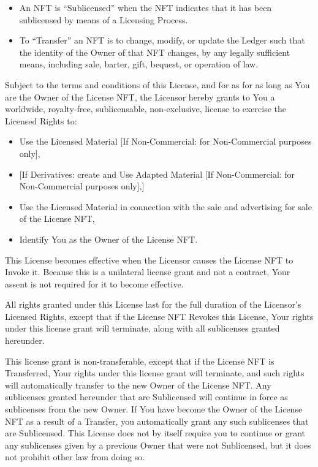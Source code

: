 \documentclass{article}
\newcommand{\sect}[1]{\vspace{12pt}\noindent{\strong{#1}}}
\begin{document}
\begin{sffamily}
\begin{itemize}
	\item	An NFT is ``Sublicensed'' when the NFT indicates that it has been sublicensed by means of a Licensing Process.

	\item	To ``Transfer'' an NFT is to change, modify, or update the Ledger such that the identity of the Owner of that NFT changes, by any legally sufficient means, including sale, barter, gift, bequest, or operation of law. 
	
	\end{itemize}



\sect{License Grant}

Subject to the terms and conditions of this License, and for as for as long as You are the Owner of the License NFT, the Licensor hereby grants to You a worldwide, royalty-free, sublicensable, non-exclusive, license to exercise the Licensed Rights to:
\begin{itemize}
\item Use the Licensed Material [If Non-Commercial: for Non-Commercial purposes only],
\item {[}If Derivatives: create and Use Adapted Material [If Non-Commercial: for Non-Commercial purposes only],]
\item Use the Licensed Material in connection with the sale and advertising for sale of the License NFT,
\item Identify You as the Owner of the License NFT.
\end{itemize}
This License becomes effective when the Licensor causes the License NFT to Invoke it. Because this is a unilateral license grant and not a contract, Your assent is not required for it to become effective.

All rights granted under this License last for the full duration of the Licensor's Licensed Rights, except that if the License NFT Revokes this License, Your rights under this license grant will terminate, along with all sublicenses granted hereunder. 

This license grant is non-transferable, except that if the License NFT is Transferred, Your rights under this license grant will terminate, and such rights will automatically transfer to the new Owner of the License NFT. Any sublicenses granted hereunder that are Sublicensed will continue in force as sublicenses from the new Owner. If You have become the Owner of the License NFT as a result of a Transfer, you automatically grant any such sublicenses that are Sublicensed. This License does not by itself require you to continue or grant any sublicenses given by a previous Owner that were not Sublicensed, but it does not prohibit other law from doing so.





\end{sffamily}
\end{document}
